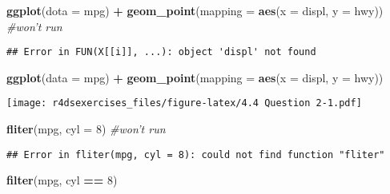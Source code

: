 \documentclass[
]{book}
\newenvironment{Shaded}{\begin{snugshade}}{\end{snugshade}}
\newcommand{\CommentTok}[1]{\textcolor[rgb]{0.56,0.35,0.01}{\textit{#1}}}
\newcommand{\DataTypeTok}[1]{\textcolor[rgb]{0.13,0.29,0.53}{#1}}
\newcommand{\DecValTok}[1]{\textcolor[rgb]{0.00,0.00,0.81}{#1}}
\newcommand{\KeywordTok}[1]{\textcolor[rgb]{0.13,0.29,0.53}{\textbf{#1}}}
\newcommand{\NormalTok}[1]{#1}
\newcommand{\OperatorTok}[1]{\textcolor[rgb]{0.81,0.36,0.00}{\textbf{#1}}}
\newcommand{\StringTok}[1]{\textcolor[rgb]{0.31,0.60,0.02}{#1}}
\begin{document}
\begin{Shaded}
\begin{Highlighting}[]
\KeywordTok{ggplot}\NormalTok{(}\DataTypeTok{dota =}\NormalTok{ mpg) }\OperatorTok{+}\StringTok{ }
\StringTok{  }\KeywordTok{geom_point}\NormalTok{(}\DataTypeTok{mapping =} \KeywordTok{aes}\NormalTok{(}\DataTypeTok{x =}\NormalTok{ displ, }\DataTypeTok{y =}\NormalTok{ hwy)) }\CommentTok{#won't run}
\end{Highlighting}
\end{Shaded}

\begin{verbatim}
## Error in FUN(X[[i]], ...): object 'displ' not found
\end{verbatim}

\begin{Shaded}
\begin{Highlighting}[]
\KeywordTok{ggplot}\NormalTok{(}\DataTypeTok{data =}\NormalTok{ mpg) }\OperatorTok{+}\StringTok{ }
\StringTok{  }\KeywordTok{geom_point}\NormalTok{(}\DataTypeTok{mapping =} \KeywordTok{aes}\NormalTok{(}\DataTypeTok{x =}\NormalTok{ displ, }\DataTypeTok{y =}\NormalTok{ hwy))}
\end{Highlighting}
\end{Shaded}

\texttt{[image: r4dsexercises\_files/figure-latex/4.4 Question 2-1.pdf]}

\begin{Shaded}
\begin{Highlighting}[]
\KeywordTok{fliter}\NormalTok{(mpg, }\DataTypeTok{cyl =} \DecValTok{8}\NormalTok{) }\CommentTok{#won't run}
\end{Highlighting}
\end{Shaded}

\begin{verbatim}
## Error in fliter(mpg, cyl = 8): could not find function "fliter"
\end{verbatim}

\begin{Shaded}
\begin{Highlighting}[]
\KeywordTok{filter}\NormalTok{(mpg, cyl }\OperatorTok{==}\StringTok{ }\DecValTok{8}\NormalTok{)}
\end{Highlighting}
\end{Shaded}
\end{document}
